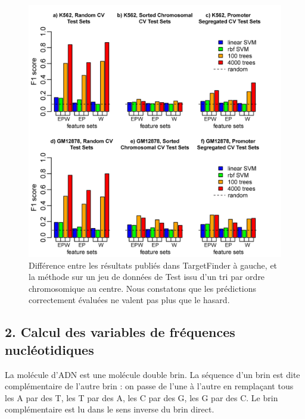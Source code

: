 \documentclass[french]{llncs}
\begin{document}
\begin{figure}[h]
\begin{center}
 	\includegraphics[width=1\linewidth]{Images/xi.PNG}
 \caption{Différence entre les résultats publiés dans TargetFinder à gauche, et la méthode sur un jeu de données de Test issu d'un tri par ordre chromosomique au centre. Nous constatons que les prédictions correctement évaluées ne valent pas plus que le hasard.} \label{fig/correction_biais}
\end{center}
\end{figure}

\newpage
\subsection*{2. Calcul des variables de fréquences nucléotidiques}

La molécule d'ADN est une molécule double brin. La séquence d'un brin est dite  complémentaire de l'autre brin : on passe de l'une à l'autre en remplaçant tous les A par des T, les T par des A, les C par des G, les G par des C. Le brin complémentaire est lu dans le sens inverse du brin direct.
        
\end{document}
